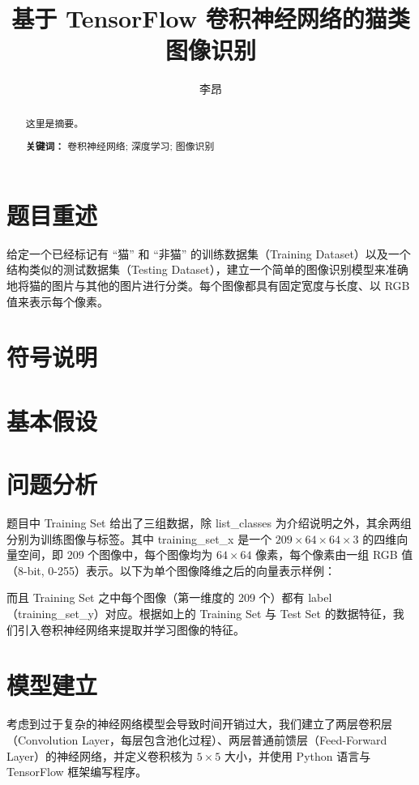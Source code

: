 \documentclass[UTF8]{ctexart}
\author{李昂}
\title{基于 TensorFlow 卷积神经网络的猫类图像识别}
\begin{document}
\maketitle
\begin{abstract}
这里是摘要。
\begin{flushleft}
\textbf{关键词：} 卷积神经网络; 深度学习; 图像识别
\end{flushleft}
\end{abstract}

\clearpage

\section{题目重述}
给定一个已经标记有 “猫” 和 “非猫” 的训练数据集（Training Dataset）以及一个结构类似的测试数据集（Testing Dataset），建立一个简单的图像识别模型来准确地将猫的图片与其他的图片进行分类。每个图像都具有固定宽度与长度、以 RGB 值来表示每个像素。

\section{符号说明}


\section{基本假设}

\section{问题分析}
题目中 Training Set 给出了三组数据，除 list\_classes 为介绍说明之外，其余两组分别为训练图像与标签。其中 training\_set\_x 是一个 $209 \times 64 \times 64 \times 3$ 的四维向量空间，即 209 个图像中，每个图像均为 $64 \times 64$ 像素，每个像素由一组 RGB 值（8-bit, 0-255）表示。以下为单个图像降维之后的向量表示样例：

而且 Training Set 之中每个图像（第一维度的 209 个）都有 label（training\_set\_y）对应。根据如上的 Training Set 与 Test Set 的数据特征，我们引入卷积神经网络来提取并学习图像的特征。

\section{模型建立}
考虑到过于复杂的神经网络模型会导致时间开销过大，我们建立了两层卷积层（Convolution Layer，每层包含池化过程）、两层普通前馈层（Feed-Forward Layer）的神经网络，并定义卷积核为 $5 \times 5$ 大小，并使用 Python 语言与 TensorFlow 框架编写程序。
\end{document}
